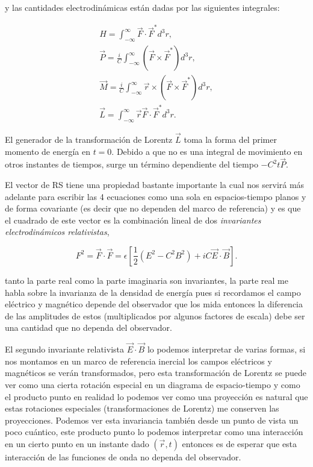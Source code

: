             y las cantidades electrodinámicas están dadas por las siguientes integrales:

            \begin{align}\label{eq:VariableselectrodinamicasRS}
                H = \int_{-\infty}^{\infty} \Vec{F}\cdot\Vec{F}^*d^3r, \\
                \Vec{P} = \frac{i}{C}\int_{-\infty}^{\infty}\left(\Vec{F}\times \Vec{F}^* \right)d^3r, \\
                \Vec{M} = \frac{i}{C}\int_{-\infty}^{\infty}\Vec{r}\times\left(\Vec{F}\times \Vec{F}^* \right)d^3r, \\
                \Vec{L} = \int_{-\infty}^{\infty} \Vec{r} \Vec{F}\cdot\Vec{F}^*d^3r.
            \end{align}

            El generador de la transformación de Lorentz $\Vec{L}$ toma la forma del primer momento de energía en $t=0$. Debido a que no es una integral de movimiento en otros instantes de tiempos, surge un término dependiente del tiempo $-C^2t\Vec{P}$.

            El vector de RS tiene una propiedad bastante importante la cual nos servirá más adelante para escribir las 4 ecuaciones como una sola en espacios-tiempo planos y de forma covariante (es decir que no dependen del marco de referencia) y es que el cuadrado de este vector es la combinación lineal de dos \textit{invariantes electrodinámicos relativistas},

            \begin{equation}
                F^2 = \Vec{F}\cdot\Vec{F} = \epsilon\left[\frac{1}{2}(E^2 - C^2B^2) + iC \Vec{E}\cdot\Vec{B}\right].
            \end{equation}

            tanto la parte real como la parte imaginaria son invariantes, la parte real me habla sobre la invarianza de la densidad de energía pues si recordamos el campo eléctrico y magnético depende del observador que los mida entonces la diferencia de las amplitudes de estos (multiplicados por algunos factores de escala) debe ser una cantidad que no dependa del observador. 

            El segundo invariante relativista $\Vec{E}\cdot\Vec{B}$ lo podemos interpretar de varias formas, si nos montamos en un marco de referencia inercial los campos eléctricos y magnéticos se verán transformados, pero esta transformación de Lorentz se puede ver como una cierta rotación especial en un diagrama de espacio-tiempo y como el producto punto en realidad lo podemos ver como una proyección es natural que estas rotaciones especiales (transformaciones de Lorentz) me conserven las proyecciones. Podemos ver esta invariancia también desde un punto de vista un poco cuántico, este producto punto lo podemos interpretar como una interacción en un cierto punto en un instante dado $(\Vec{r},t)$ entonces es de esperar que esta interacción de las funciones de onda no dependa del observador.\\

